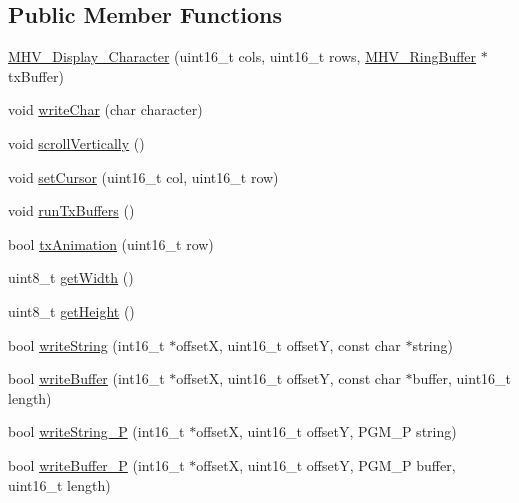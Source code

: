 \subsection*{\-Public \-Member \-Functions}
\begin{DoxyCompactItemize}
\item 
\hyperlink{class_m_h_v___display___character_a5d2d4f3dae1f78ff028f3cf30836d176}{\-M\-H\-V\-\_\-\-Display\-\_\-\-Character} (uint16\-\_\-t cols, uint16\-\_\-t rows, \hyperlink{class_m_h_v___ring_buffer}{\-M\-H\-V\-\_\-\-Ring\-Buffer} $\ast$tx\-Buffer)
\item 
void \hyperlink{class_m_h_v___display___character_a9911b577fc34674c794bceccea827384}{write\-Char} (char character)
\item 
void \hyperlink{class_m_h_v___display___character_a1ad8bf055b841a07306a10d68586f8c7}{scroll\-Vertically} ()
\item 
void \hyperlink{class_m_h_v___display___character_a5720ca3afd3127a6a7a3294d22e2ee66}{set\-Cursor} (uint16\-\_\-t col, uint16\-\_\-t row)
\item 
void \hyperlink{class_m_h_v___display___character_ae3cf2037be781199466b44997041ab2a}{run\-Tx\-Buffers} ()
\item 
bool \hyperlink{class_m_h_v___display___character_a6c114f961e9c25d31bbad979908e7a60}{tx\-Animation} (uint16\-\_\-t row)
\item 
uint8\-\_\-t \hyperlink{class_m_h_v___display___character_af934b1439ee39e0dbc364bd50f301517}{get\-Width} ()
\item 
uint8\-\_\-t \hyperlink{class_m_h_v___display___character_a6e21f7f850ae25ecee4b02644bcc2556}{get\-Height} ()
\item 
bool \hyperlink{class_m_h_v___display___character_a5a5ab3f6e5e5c825347cc09a95bf45de}{write\-String} (int16\-\_\-t $\ast$offset\-X, uint16\-\_\-t offset\-Y, const char $\ast$string)
\item 
bool \hyperlink{class_m_h_v___display___character_aabb66a9900c911ceeee7c9d2820543dc}{write\-Buffer} (int16\-\_\-t $\ast$offset\-X, uint16\-\_\-t offset\-Y, const char $\ast$buffer, uint16\-\_\-t length)
\item 
bool \hyperlink{class_m_h_v___display___character_ab326db62411867434bdc769340672727}{write\-String\-\_\-\-P} (int16\-\_\-t $\ast$offset\-X, uint16\-\_\-t offset\-Y, \-P\-G\-M\-\_\-\-P string)
\item 
bool \hyperlink{class_m_h_v___display___character_a50c07885a440f5092c21b0d602ca5007}{write\-Buffer\-\_\-\-P} (int16\-\_\-t $\ast$offset\-X, uint16\-\_\-t offset\-Y, \-P\-G\-M\-\_\-\-P buffer, uint16\-\_\-t length)

\end{DoxyCompactItemize}
